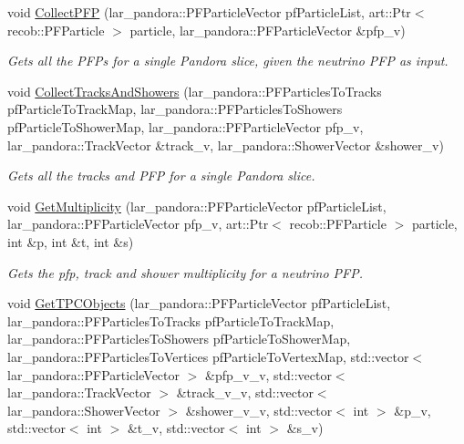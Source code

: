 \begin{DoxyCompactItemize}
\item 
void \hyperlink{group__UBXSec_gab55f5535163da51b4aeef1805041876b}{Collect\-P\-F\-P} (lar\-\_\-pandora\-::\-P\-F\-Particle\-Vector pf\-Particle\-List, art\-::\-Ptr$<$ recob\-::\-P\-F\-Particle $>$ particle, lar\-\_\-pandora\-::\-P\-F\-Particle\-Vector \&pfp\-\_\-v)
\begin{DoxyCompactList}\small\item\em Gets all the P\-F\-Ps for a single Pandora slice, given the neutrino P\-F\-P as input. \end{DoxyCompactList}\item 
void \hyperlink{group__UBXSec_ga3634deb340ab0cc3c9f00b34386bfa72}{Collect\-Tracks\-And\-Showers} (lar\-\_\-pandora\-::\-P\-F\-Particles\-To\-Tracks pf\-Particle\-To\-Track\-Map, lar\-\_\-pandora\-::\-P\-F\-Particles\-To\-Showers pf\-Particle\-To\-Shower\-Map, lar\-\_\-pandora\-::\-P\-F\-Particle\-Vector pfp\-\_\-v, lar\-\_\-pandora\-::\-Track\-Vector \&track\-\_\-v, lar\-\_\-pandora\-::\-Shower\-Vector \&shower\-\_\-v)
\begin{DoxyCompactList}\small\item\em Gets all the tracks and P\-F\-P for a single Pandora slice. \end{DoxyCompactList}\item 
void \hyperlink{group__UBXSec_ga437689da2d66221826a17fece49e581c}{Get\-Multiplicity} (lar\-\_\-pandora\-::\-P\-F\-Particle\-Vector pf\-Particle\-List, lar\-\_\-pandora\-::\-P\-F\-Particle\-Vector pfp\-\_\-v, art\-::\-Ptr$<$ recob\-::\-P\-F\-Particle $>$ particle, int \&p, int \&t, int \&s)
\begin{DoxyCompactList}\small\item\em Gets the pfp, track and shower multiplicity for a neutrino P\-F\-P. \end{DoxyCompactList}\item 
void \hyperlink{group__UBXSec_ga4265f9226b84aa982bdb5039bdd7738a}{Get\-T\-P\-C\-Objects} (lar\-\_\-pandora\-::\-P\-F\-Particle\-Vector pf\-Particle\-List, lar\-\_\-pandora\-::\-P\-F\-Particles\-To\-Tracks pf\-Particle\-To\-Track\-Map, lar\-\_\-pandora\-::\-P\-F\-Particles\-To\-Showers pf\-Particle\-To\-Shower\-Map, lar\-\_\-pandora\-::\-P\-F\-Particles\-To\-Vertices pf\-Particle\-To\-Vertex\-Map, std\-::vector$<$ lar\-\_\-pandora\-::\-P\-F\-Particle\-Vector $>$ \&pfp\-\_\-v\-\_\-v, std\-::vector$<$ lar\-\_\-pandora\-::\-Track\-Vector $>$ \&track\-\_\-v\-\_\-v, std\-::vector$<$ lar\-\_\-pandora\-::\-Shower\-Vector $>$ \&shower\-\_\-v\-\_\-v, std\-::vector$<$ int $>$ \&p\-\_\-v, std\-::vector$<$ int $>$ \&t\-\_\-v, std\-::vector$<$ int $>$ \&s\-\_\-v)

\end{DoxyCompactItemize}
